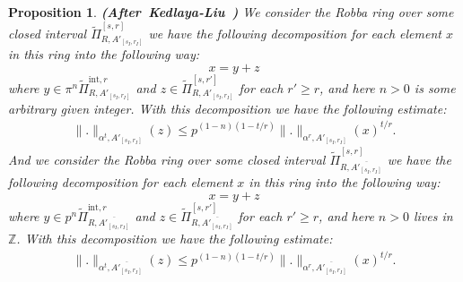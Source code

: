\documentclass[12pt]{amsart}
\newtheorem{proposition}[theorem]{Proposition}
\theoremstyle{definition}
\numberwithin{equation}{section}
\begin{document}
\begin{proposition} \mbox{\bf{(After Kedlaya-Liu \cite[Lemma 5.2.7]{KL1})}} 
We consider the Robba ring over some closed interval $\widetilde{\Pi}^{[s,r]}_{R,A'_{[s_I,r_I]}}$ we have the following decomposition for each element $x$ in this ring into the following way:
\begin{displaymath}
x=y+z	
\end{displaymath}
where $y\in \pi^n \widetilde{\Pi}^{\mathrm{int},r}_{R,A'_{[s_I,r_I]}}$ and $z\in \widetilde{\Pi}^{[s,r']}_{R,A'_{[s_I,r_I]}}$ for each $r'\geq r$, and here $n>0$ is some arbitrary given integer. With this decomposition we have the following estimate:
\begin{align}
\|.\|_{\alpha^t,A'_{[s_I,r_I]}}(z)\leq p^{(1-n)(1-t/r)}\|.\|_{\alpha^r,A'_{[s_I,r_I]}}(x)^{t/r}.	
\end{align}
And we consider the Robba ring over some closed interval $\widetilde{\Pi}^{[s,r]}_{R,\overline{A'_{[s_I,r_I]}}}$ we have the following decomposition for each element $x$ in this ring into the following way:
\begin{displaymath}
x=y+z	
\end{displaymath}
where $y\in p^n \widetilde{\Pi}^{\mathrm{int},r}_{R,\overline{A'_{[s_I,r_I]}}}$ and $z\in \widetilde{\Pi}^{[s,r']}_{R,\overline{A'_{[s_I,r_I]}}}$ for each $r'\geq r$, and here $n>0$ lives in $\mathbb{Z}$. With this decomposition we have the following estimate:
\begin{align}
\|.\|_{\alpha^t,\overline{A'_{[s_I,r_I]}}}(z)\leq p^{(1-n)(1-t/r)}\|.\|_{\alpha^r,\overline{A'_{[s_I,r_I]}}}(x)^{t/r}.	
\end{align}

	
\end{proposition}
\end{document}
